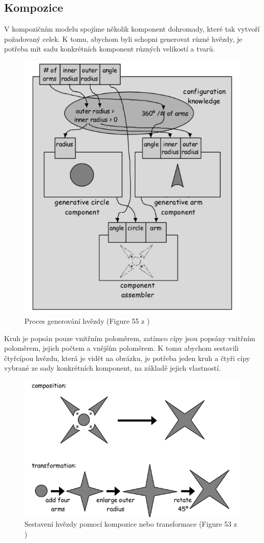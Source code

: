 \subsection{Kompozice}
V kompozičním modelu spojíme několik komponent dohromady, které tak vytvoří požadovaný celek. K tomu, abychom byli schopni generovat různé hvězdy, je potřeba mít sadu konkrétních komponent různých velikostí a tvarů.
\begin{figure}[H]
	\centering
	\includegraphics[width=13cm]{images/generating_process}
	\caption{Proces generování hvězdy (Figure 55 z \cite{Czarnecki98} )}
\end{figure}
Kruh je popsán pouze vnitřním poloměrem, zatímco cípy jsou popsány vnitřním poloměrem, jejich počtem a vnějším poloměrem. K tomu abychom sestavili čtyřcípou hvězdu, která je vidět na obrázku, je potřeba jeden kruh a čtyři cípy vybrané ze sady konkrétních komponent, na základě jejich vlastností.
\begin{figure}[H]
	\centering
	\includegraphics[width=13cm]{images/comparison}
	\caption{Sestavení hvězdy pomocí kompozice nebo transformace (Figure 53 z \cite{Czarnecki98} )}
\end{figure}
